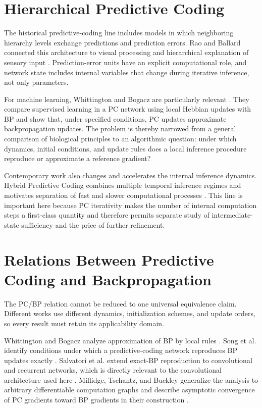 \section{Hierarchical Predictive Coding}
\label{sec:related-pc}

The historical predictive-coding line includes models in which neighboring hierarchy
levels exchange predictions and prediction errors. Rao and Ballard connected this
architecture to visual processing and hierarchical explanation of sensory input
\cite{rao1999predictive}. Prediction-error units have an explicit computational role,
and network state includes internal variables that change during iterative inference,
not only parameters.

For machine learning, Whittington and Bogacz are particularly relevant
\cite{whittington2017approximation}. They compare supervised learning in a PC network
using local Hebbian updates with BP and show that, under specified conditions, PC
updates approximate backpropagation updates. The problem is thereby narrowed from a
general comparison of biological principles to an algorithmic question: under which
dynamics, initial conditions, and update rules does a local inference procedure
reproduce or approximate a reference gradient?

Contemporary work also changes and accelerates the internal inference dynamics. Hybrid
Predictive Coding combines multiple temporal inference regimes and motivates separation
of fast and slower computational processes \cite{tschantz2023hybrid}. This line is
important here because PC iterativity makes the number of internal computation steps a
first-class quantity and therefore permits separate study of intermediate-state
sufficiency and the price of further refinement.

\section{Relations Between Predictive Coding and Backpropagation}
\label{sec:related-pc-bp}

The PC/BP relation cannot be reduced to one universal equivalence claim. Different
works use different dynamics, initialization schemes, and update orders, so every
result must retain its applicability domain.

Whittington and Bogacz analyze approximation of BP by local rules
\cite{whittington2017approximation}. Song et al. identify conditions under which a
predictive-coding network reproduces BP updates exactly \cite{song2020exact}.
Salvatori et al. extend exact-BP reproduction to convolutional and recurrent networks,
which is directly relevant to the convolutional architecture used here
\cite{salvatori2021convolutional}. Millidge, Tschantz, and Buckley generalize the
analysis to arbitrary differentiable computation graphs and describe asymptotic
convergence of PC gradients toward BP gradients in their construction
\cite{millidge2022arbitrary}.

